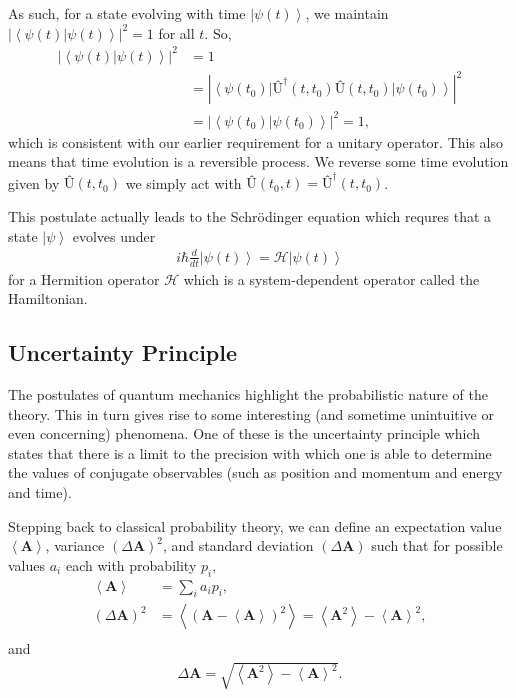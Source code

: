 \documentclass[11pt]{article} %
\newcommand{\bra}[1]{\left\langle #1 \right|}
\newcommand{\ket}[1]{\left|#1\right\rangle}
\newcommand{\braket}[2]{\left\langle#1 |  #2\right\rangle}
\begin{document}
As such, for a state evolving with time $\ket{\psi(t)}$, we maintain $\left|\braket{\psi(t)}{\psi(t)}\right|^2 = 1$ for all $t$. So,
\begin{align}
    \left|\braket{\psi(t)}{\psi(t)}\right|^2 &= 1\\
    &= \left|\bra{\psi(t_0)}\textbf{\^U}^\dagger(t,t_0)\textbf{\^U}(t,t_0)\ket{\psi(t_0)}\right|^2\nonumber\\
    &= \left|\braket{\psi(t_0)}{\psi(t_0)}\right|^2 = 1,
\end{align}
which is consistent with our earlier requirement for a unitary operator. This also means that time evolution is a reversible process. We reverse some time evolution given by $\textbf{\^U}(t,t_0)$ we simply act with $\textbf{\^U}(t_0,t) = \textbf{\^U}^\dagger(t,t_0)$.

This postulate actually leads to the Schr\"odinger equation which requres that a state $\ket{\psi}$ evolves under
\begin{align}
    i\hbar\frac{d}{dt}\ket{\psi(t)} = \mathcal{H}\ket{\psi(t)}
\end{align}
for a Hermition operator $\mathcal{H}$ which is a system-dependent operator called the Hamiltonian.

\subsection{Uncertainty Principle}

The postulates of quantum mechanics highlight the probabilistic nature of the theory. This in turn gives rise to some interesting (and sometime unintuitive or even concerning) phenomena. One of these is the uncertainty principle which states that there is a limit to the precision with which one is able to determine the values of conjugate observables (such as position and momentum and energy and time).

Stepping back to classical probability theory, we can define an expectation value $\left<\textbf{A}\right>$, variance $(\Delta\textbf{A})^2$, and standard deviation $(\Delta\textbf{A})$ such that for possible values $a_i$ each with probability $p_i$,
\begin{align}
    \left<\textbf{A}\right> &= \sum_ia_ip_i,\\
    (\Delta\textbf{A})^2 &= \left<\left(\textbf{A}-\left<\textbf{A}\right>\right)^2\right> = \left<\textbf{A}^2\right> - \left<\textbf{A}\right>^2,\\
\end{align}
and
\begin{align}
    \Delta\textbf{A} = \sqrt{\left<\textbf{A}^2\right> - \left<\textbf{A}\right>^2}.
\end{align}
\end{document}
